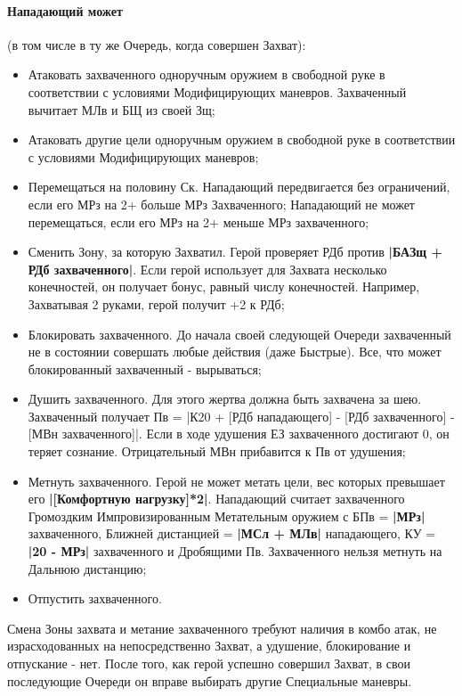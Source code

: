 \paragraph{Нападающий может} (в том числе в ту же Очередь, когда совершен Захват):
\begin{itemize}
  \item Атаковать захваченного одноручным оружием в свободной руке в соответствии с условиями Модифицирующих маневров. Захваченный вычитает МЛв и БЩ из своей Зщ;
  \item Атаковать другие цели одноручным оружием в свободной руке в соответствии с условиями Модифицирующих маневров;
  \item Перемещаться на половину Ск. Нападающий передвигается без ограничений, если его МРз на 2+ больше МРз Захваченного; Нападающий не может перемещаться, если его МРз на 2+ меньше МРз захваченного;
  \item Сменить Зону, за которую Захватил. Герой проверяет РДб против \textbf{|БАЗщ + РДб захваченного|}. Если герой использует для Захвата несколько конечностей, он получает бонус, равный числу конечностей. Например, Захватывая 2 руками, герой получит +2 к РДб;
  \item Блокировать захваченного. До начала своей следующей Очереди захваченный не в состоянии совершать любые действия (даже Быстрые). Все, что может блокированный захваченный - вырываться;
  \item Душить захваченного. Для этого жертва должна быть захвачена за шею. Захваченный получает Пв = |К20 + [РДб нападающего] - [РДб захваченного] - [МВн захваченного]|. Если в ходе удушения ЕЗ захваченного достигают 0, он теряет сознание. Отрицательный МВн прибавится к Пв от удушения;
  \item Метнуть захваченного. Герой не может метать цели, вес которых превышает его \textbf{|[Комфортную нагрузку]*2|}.
    \newline Нападающий считает захваченного Громоздким Импровизированным Метательным оружием с БПв = \textbf{|МРз|} захваченного, Ближней дистанцией = \textbf{|МСл + МЛв|} нападающего, КУ = \textbf{|20 - МРз|} захваченного и Дробящими Пв. Захваченного нельзя метнуть на Дальнюю дистанцию;
  \item Отпустить захваченного.
\end{itemize}
Смена Зоны захвата и метание захваченного требуют наличия в комбо атак, не израсходованных на непосредственно Захват, а удушение, блокирование и отпускание - нет.
\newline После того, как герой успешно совершил Захват, в свои последующие Очереди он вправе выбирать другие Специальные маневры.

